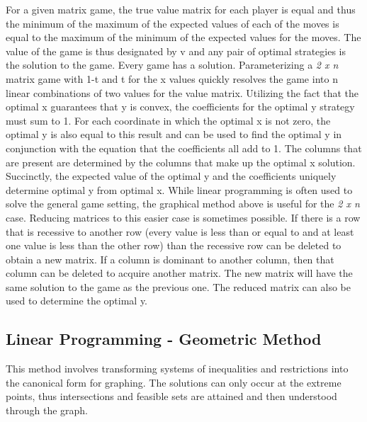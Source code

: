 \documentclass[12pt]{article}
\begin{document}
\newline
For a given matrix game, the true value matrix for each player is equal and thus the minimum of the maximum of the expected values of each of the moves is equal to the maximum of the minimum 
of the expected values for the moves. The value of the game is thus designated by v and any pair of optimal strategies is the solution to the game. Every game has a solution. Parameterizing 
a \textit{2 x n} matrix game with 1-t and t for the x values quickly resolves the game into n linear combinations of two values for the value matrix. Utilizing the fact that the optimal 
x guarantees that y is convex, the coefficients for the optimal y strategy must sum to 1. For each coordinate in which the optimal x is not zero, the optimal y is also equal to this result 
and can be used to find the optimal y in conjunction with the equation that the coefficients all add to 1. The columns that are present are determined by the columns that make up the optimal 
x solution. Succinctly, the expected value of the optimal y and the coefficients uniquely determine optimal y from optimal x. 
\newline
\newline
While linear programming is often used to solve the general game setting, the graphical method above is useful for the \textit{2 x n} case. Reducing matrices to this easier case is sometimes 
possible. If there is a row that is recessive to another row (every value is less than or equal to and at least one value is less than the other row) than the recessive row can be deleted to 
obtain a new matrix. If a column is dominant to another column, then that column can be deleted to acquire another matrix. The new matrix will have the same solution to the game as the previous 
one. The reduced matrix can also be used to determine the optimal y. 
\subsection{Linear Programming - Geometric Method}
This method involves transforming systems of inequalities and restrictions into the canonical form for graphing. The solutions can only occur at the extreme points, thus intersections and 
feasible sets are attained and then understood through the graph. 
\end{document}
